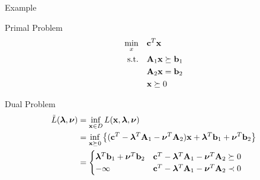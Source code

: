 \documentclass[12pt,notes,mathserif]{beamer}
\begin{document}
\begin{frame}
	{Example}

	\begin{block}{Primal Problem}
		\vspace{-1em}
		\begin{equation}
			\begin{aligned}
				\min_x \quad        & \mathbf{c}^T \mathbf{x}               \\
				\textrm{s.t.} \quad & \mathbf{A}_1 \mathbf{x} \succeq \mathbf{b}_1 \\
				                    & \mathbf{A}_2 \mathbf{x} = \mathbf{b}_2       \\
				                    & \mathbf{x} \succeq 0           \\
			\end{aligned}
		\end{equation}
	\end{block}
	\pause
	\begin{block}{Dual Problem}
		\vspace{-1em}
		\begin{equation*}
			\begin{aligned}
				\tilde{L}(\boldsymbol{\lambda}, \boldsymbol{\nu} ) & = \inf_{\mathbf{x} \in D} L(\mathbf{x}, \boldsymbol{\lambda}, \boldsymbol{\nu})                                                                                \\
				                           & = \inf_{\mathbf{x} \succeq 0} \left\{ (\mathbf{c}^T - \boldsymbol{\lambda}^T \mathbf{A}_1 - \boldsymbol{\nu}^T \mathbf{A}_2 ) \mathbf{x} + \boldsymbol{\lambda}^T \mathbf{b}_1 + \boldsymbol{\nu}^T \mathbf{b}_2 \right\} \\
				                           & = \begin{cases}
					\boldsymbol{\lambda}^T \mathbf{b}_1 + \boldsymbol{\nu}^T \mathbf{b}_2 & \mathbf{c}^T - \boldsymbol{\lambda}^T \mathbf{A}_1 - \boldsymbol{\nu}^T \mathbf{A}_2 \succeq 0 \\
					-\infty                         & \mathbf{c}^T - \boldsymbol{\lambda}^T \mathbf{A}_1 - \boldsymbol{\nu}^T \mathbf{A}_2 \prec 0   \\
				\end{cases}                                                                                             \\
			\end{aligned}
		\end{equation*}
	\end{block}
\end{frame}
\end{document}
